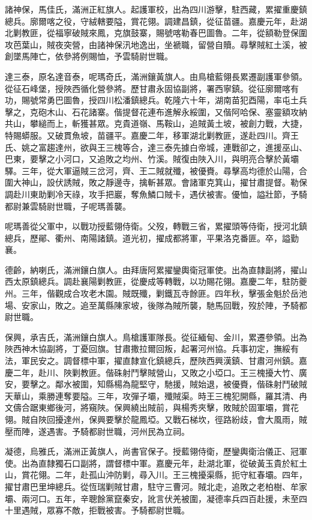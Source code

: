 \begin{pinyinscope}
諸神保，馬佳氏，滿洲正紅旗人。起護軍校，出為四川游擊，駐西藏，累擢重慶鎮總兵。廓爾喀之役，守絨轄要隘，賞花翎。調建昌鎮，從征苗疆。嘉慶元年，赴湖北剿教匪，從福寧破賊來鳳，克旗鼓寨，賜號喀勒春巴圖魯。二年，從額勒登保圍攻芭葉山，賊夜突營，由諸神保汛地逸出，坐褫職，留營自贖。尋擊賊紅土溪，被創墜馬陣亡，依參將例賜恤，予雲騎尉世職。

達三泰，原名達音泰，呢瑪奇氏，滿洲鑲黃旗人。由鳥槍藍翎長累遷副護軍參領。從征石峰堡，授陜西循化營參將。歷甘肅永固協副將，署西寧鎮。從征廓爾喀有功，賜號常勇巴圖魯，授四川松潘鎮總兵。乾隆六十年，湖南苗犯酉陽，率屯土兵擊之，克砲木山、石花諸寨。偕提督花連布進解永綏圍，又偕阿哈保、塞靈額攻納共山，攀縋而上，斬獲甚眾。克貴道嶺、馬鞍山，追賊黃土坡，被創力戰，大捷，特賜蟒服。又破貫魚坡，苗疆平。嘉慶二年，移軍湖北剿教匪，遂赴四川。齊王氏、姚之富趨達州，欲與王三槐等合，達三泰先據白帝城，連戰卻之，進援巫山、巴東，要擊之小河口，又追敗之均州、竹溪。賊復由陜入川，與明亮合擊於黃壩驛。三年，從大軍逼賊三岔河，齊、王二賊就殲，被優賚。尋擊高均德於山陽，合圍大神山，設伏誘賊，敗之靜邊寺，擒斬甚眾。會諸軍克箕山，擢甘肅提督。勒保調赴川東助剿冷天祿，攻手把巖，奪魚鱗口賊卡，遇伏被害。優恤，謚壯節，予騎都尉兼雲騎尉世職，子呢瑪善襲。

呢瑪善從父軍中，以戰功授藍翎侍衛。父歿，轉戰三省，累擢頭等侍衛，授河北鎮總兵，歷鄖、衢州、南陽諸鎮。道光初，擢成都將軍，平果洛克番匪。卒，謚勤襄。

德齡，納喇氏，滿洲鑲白旗人。由拜唐阿累擢鑾輿衛冠軍使。出為直隸副將，擢山西太原鎮總兵。調赴襄陽剿教匪，從慶成等轉戰，以功賜花翎。嘉慶二年，駐防夔州。三年，偕觀成合攻老木園。賊既殲，剿鐵瓦寺餘匪。四年秋，擊張金魁於岳池場、安家山，敗之。追至萬縣陳家坡，後隊為賊所襲，馳馬回戰，歿於陣，予騎都尉世職。

保興，承吉氏，滿洲鑲白旗人。鳥槍護軍隊長。從征緬甸、金川，累遷參領。出為陜西神木協副將，丁憂回旗。甘肅撒拉爾回叛，起署河州協。兵事初定，撫綏有法，軍民安之。調督標中軍，擢直隸宣化鎮總兵，歷陜西興漢鎮、甘肅河州鎮。嘉慶二年，赴川、陜剿教匪。偕硃射鬥擊賊營山，又敗之小埡口。王三槐擾大竹、廣安，要擊之。鄰水被圍，知縣楊為龍堅守，馳援，賊始退，被優賚，偕硃射鬥破賊天華山，乘勝連奪要隘。三年，攻彈子壩，殲賊渠。時王三槐犯開縣，羅其清、冉文儔合踞東鄉後河，將窺陜。保興繞出賊前，與楊秀夾擊，敗賊於固軍壩，賞花翎。賊自陜回擾達州，保興要擊於龍鳳埡。又戰石梯坎，徑路紛歧，會大風雨，賊壓而陣，遂遇害。予騎都尉世職，河州民為立祠。

凝德，烏雅氏，滿洲正黃旗人，尚書官保子。授藍翎侍衛，歷鑾輿衛治儀正、冠軍使。出為直隸獨石口副將，謂督標中軍。嘉慶元年，赴湖北軍，從破黃玉貴於紅土山，賞花翎。二年，赴孤山沖防剿，尋入川。王三槐擾渠縣，扼守紅春壩。四年，擢甘肅巴里坤總兵。從恆瑞剿賊甘肅，駐守三曹河。賊北走，追敗之老柏樹、牟家壩、兩河口。五年，辛聰餘黨竄秦安，訛言伏羌被圍，凝德率兵四百赴援，未至四十里遇賊，眾寡不敵，拒戰被害。予騎都尉世職。


\end{pinyinscope}
